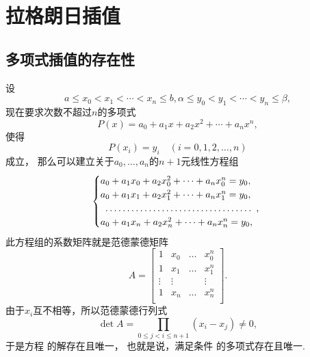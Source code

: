 \section{拉格朗日插值}
\subsection{多项式插值的存在性}
设\begin{equation*}
	a \leq x_0 < x_1 < \dotsb < x_n \leq b,
	\alpha \leq y_0 < y_1 < \dotsb < y_n \leq \beta,
\end{equation*}
现在要求次数不超过\(n\)的多项式\begin{equation*}
	P(x) = a_0 + a_1 x + a_2 x^2 + \dotsb + a_n x^n,
\end{equation*}
使得\begin{equation}\label{equation:插值法.用于插值的多项式需要满足的方程组}
	P(x_i) = y_i
	\quad(i=0,1,2,\dotsc,n)
\end{equation}成立，
那么可以建立关于\(a_0,\dotsc,a_n\)的\(n+1\)元线性方程组\begin{equation}\label{equation:插值法.用于插值的多项式的系数需要满足的线性方程组}
	\begin{cases}
		a_0 + a_1 x_0 + a_2 x_0^2 + \dotsb + a_n x_0^n = y_0, \\
		a_0 + a_1 x_1 + a_2 x_1^2 + \dotsb + a_n x_1^n = y_0, \\
		\hdotsfor{1}, \\
		a_0 + a_1 x_n + a_2 x_n^2 + \dotsb + a_n x_n^n = y_0, \\
	\end{cases}
\end{equation}
此方程组的系数矩阵就是范德蒙德矩阵\begin{equation*}
	A = \begin{bmatrix}
		1 & x_0 & \dots & x_0^n \\
		1 & x_1 & \dots & x_1^n \\
		\vdots & \vdots & & \vdots \\
		1 & x_n & \dots & x_n^n \\
	\end{bmatrix}.
\end{equation*}
由于\(x_i\)互不相等，所以范德蒙德行列式\begin{equation*}
	\det A
	= \prod_{0 \leq j < i \leq n+1} (x_i - x_j)
	\neq 0,
\end{equation*}
于是方程  的解存在且唯一，
也就是说，满足条件  的多项式存在且唯一.

